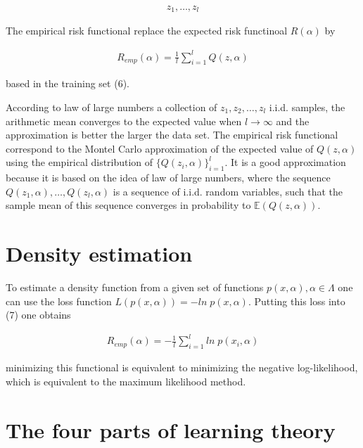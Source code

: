 \documentclass{article}
\begin{document}
\begin{align}
    z_{1}, \ldots, z_{l}
\end{align}

The empirical risk functional replace the expected risk functinoal $R(\alpha)$ by

\begin{align}
R_{emp}(\alpha) = \frac{1}{l}\sum_{i=1}^{l}Q(z,\alpha)
\end{align}

based in the training set (6). 

According to law of large numbers a collection of $z_{1}, z_{2}, \ldots, z_{l}$ i.i.d. samples, the arithmetic mean converges to the expected value when $l\rightarrow \infty$ and the approximation is better the larger the data set. The empirical risk functional correspond to the Montel Carlo approximation of the expected value of $Q(z,\alpha)$ using the empirical distribution of $\{Q(z_{i}, \alpha)\}_{i=1}^{l}$. It is a good approximation because it is based on the idea of law of large numbers, where the sequence $Q(z_{1},\alpha), \ldots, Q(z_{l},\alpha)$ is a sequence of i.i.d. random variables, such that the sample mean of this sequence converges in probability to $\mathbb{E}(Q(z,\alpha))$. \\


\section{Density estimation}
To estimate a density function from a given set of functions $p(x,\alpha), \alpha\in \Lambda$ one can use the loss function $L(p(x,\alpha))=-ln \;p(x,\alpha)$. Putting this loss into (7) one obtains  

\begin{align}
    R_{emp}(\alpha) = -\frac{1}{l}\sum_{i=1}^{l}ln\;p(x_{i},\alpha)
\end{align}

minimizing this functional is equivalent to minimizing the negative log-likelihood, which is equivalent to the maximum likelihood method.

\section{The four parts of learning theory}
\end{document}
